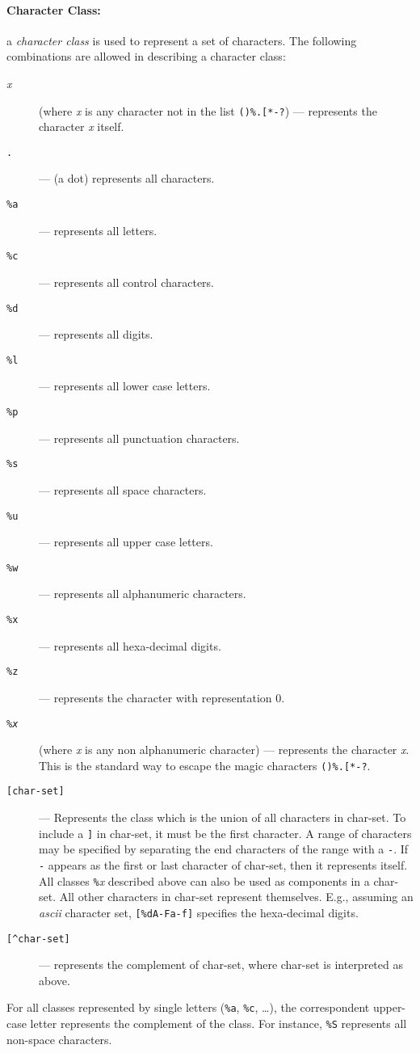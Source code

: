 \documentclass[11pt]{article}
\newcommand{\M}[1]{\emph{#1}}
\newcommand{\T}[1]{{\tt #1}}
\newcommand{\Def}[1]{\emph{#1}\index{#1}}
\begin{document}
\paragraph{Character Class:}
a \Def{character class} is used to represent a set of characters.
The following combinations are allowed in describing a character class:
\begin{description}
\item[\emph{x}] (where \emph{x} is any character not in the list \verb|()%.[*-?|)
--- represents the character \emph{x} itself.
\item[\T{.}] --- (a dot) represents all characters.
\item[\T{\%a}] --- represents all letters.
\item[\T{\%c}] --- represents all control characters.
\item[\T{\%d}] --- represents all digits.
\item[\T{\%l}] --- represents all lower case letters.
\item[\T{\%p}] --- represents all punctuation characters.
\item[\T{\%s}] --- represents all space characters.
\item[\T{\%u}] --- represents all upper case letters.
\item[\T{\%w}] --- represents all alphanumeric characters.
\item[\T{\%x}] --- represents all hexa-decimal digits.
\item[\T{\%z}] --- represents the character with representation 0.
\item[\T{\%\M{x}}] (where \M{x} is any non alphanumeric character)  ---
represents the character \M{x}.
This is the standard way to escape the magic characters \verb|()%.[*-?|.
\item[\T{[char-set]}] ---
Represents the class which is the union of all
characters in char-set.
To include a \verb|]| in char-set, it must be the first character.
A range of characters may be specified by
separating the end characters of the range with a \verb|-|.
If \verb|-| appears as the first or last character of char-set,
then it represents itself.
All classes \verb|%|\emph{x} described above can also be used as
components in a char-set.
All other characters in char-set represent themselves.
E.g., assuming an \emph{ascii} character set,
\verb|[%dA-Fa-f]| specifies the hexa-decimal digits.
\item[\T{[\^{ }char-set]}] ---
represents the complement of char-set,
where char-set is interpreted as above.
\end{description}
For all classes represented by single letters (\verb|%a|, \verb|%c|, \ldots),
the correspondent upper-case letter represents the complement of the class.
For instance, \verb|%S| represents all non-space characters.
\end{document}
